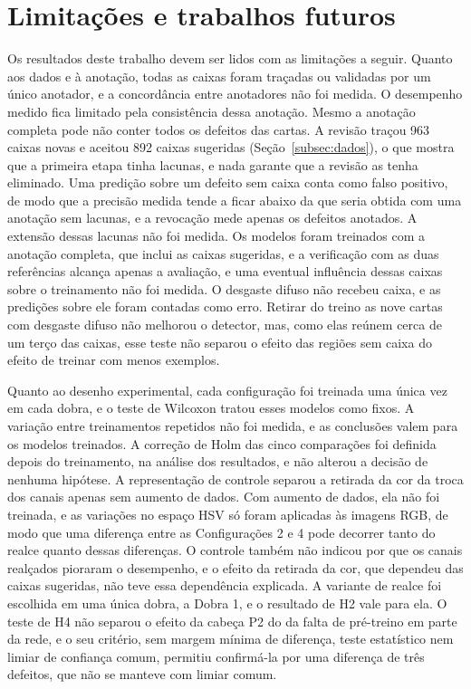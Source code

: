 \documentclass[
    12pt,                %
    openright,           %
    oneside,             %
    a4paper,             %
    english,             %
    brazil               %
]{abntex2}
\begin{document}
\section{Limitações e trabalhos futuros}
\label{sec:limitacoes}
Os resultados deste trabalho devem ser lidos com as limitações a seguir.
Quanto aos dados e à anotação, todas as caixas foram traçadas ou
validadas por um único anotador, e a concordância entre anotadores não
foi medida. O desempenho medido fica limitado pela consistência dessa
anotação. Mesmo a anotação completa pode não conter todos os
defeitos das cartas. A revisão traçou 963 caixas novas e aceitou 892 caixas sugeridas
(Seção~\ref{subsec:dados}), o que mostra que a primeira etapa tinha
lacunas, e nada garante que a revisão as tenha eliminado. Uma predição
sobre um defeito sem caixa conta como falso positivo, de modo que a
precisão medida tende a ficar abaixo da que seria obtida com uma
anotação sem lacunas, e a revocação mede apenas os defeitos anotados. A
extensão dessas lacunas não foi medida. Os modelos foram treinados com a anotação completa, que inclui
as caixas sugeridas, e a verificação com as duas referências alcança apenas
a avaliação, e uma eventual influência dessas caixas sobre o treinamento
não foi medida. O desgaste difuso não recebeu caixa, e as predições sobre ele
foram contadas como erro. Retirar do treino as nove cartas com desgaste
difuso não melhorou o detector, mas, como elas reúnem cerca de um terço
das caixas, esse teste não separou o efeito das regiões sem caixa do
efeito de treinar com menos exemplos.

Quanto ao desenho experimental, cada configuração foi treinada uma única
vez em cada dobra, e o teste de Wilcoxon tratou esses modelos como
fixos. A variação entre treinamentos repetidos não foi medida, e as
conclusões valem para os modelos treinados. A correção de Holm das
cinco comparações foi definida depois do treinamento, na análise dos
resultados, e não alterou a decisão de nenhuma hipótese. A representação de
controle separou a retirada da cor da troca dos canais apenas sem
aumento de dados. Com aumento de dados, ela não foi treinada, e as
variações no espaço HSV só foram aplicadas às imagens RGB, de modo que
uma diferença entre as Configurações 2 e 4 pode decorrer tanto do
realce quanto dessas diferenças. O controle também não indicou por que
os canais realçados pioraram o desempenho, e o efeito da retirada da
cor, que dependeu das caixas sugeridas, não teve essa dependência
explicada. A variante de realce foi escolhida em uma única dobra, a Dobra 1, e o resultado de H2 vale para ela. O teste de H4 não separou o
efeito da cabeça P2 do da falta de pré-treino em parte da rede, e o seu
critério, sem margem mínima de diferença, teste estatístico nem limiar
de confiança comum, permitiu confirmá-la por uma diferença de três
defeitos, que não se manteve com limiar comum.
\end{document}
